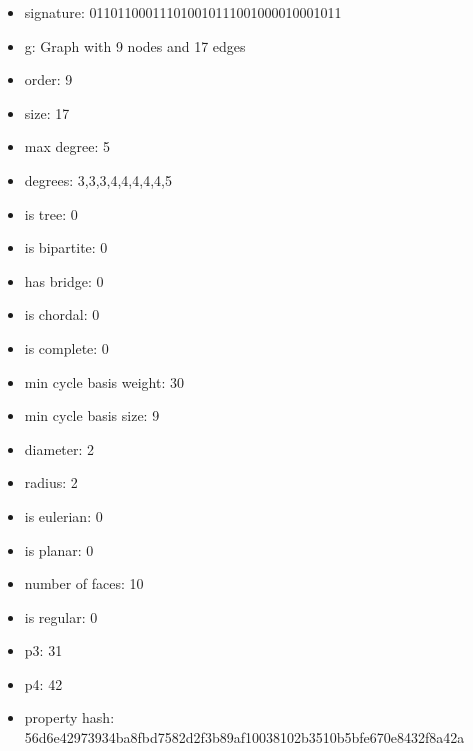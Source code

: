 \newpage
\begin{figure}
\end{figure}
\begin{itemize}
\item signature: 011011000111010010111001000010001011
\item g: Graph with 9 nodes and 17 edges
\item order: 9
\item size: 17
\item max degree: 5
\item degrees: 3,3,3,4,4,4,4,4,5
\item is tree: 0
\item is bipartite: 0
\item has bridge: 0
\item is chordal: 0
\item is complete: 0
\item min cycle basis weight: 30
\item min cycle basis size: 9
\item diameter: 2
\item radius: 2
\item is eulerian: 0
\item is planar: 0
\item number of faces: 10
\item is regular: 0
\item p3: 31
\item p4: 42
\item property hash: 56d6e42973934ba8fbd7582d2f3b89af10038102b3510b5bfe670e8432f8a42a
\end{itemize}
